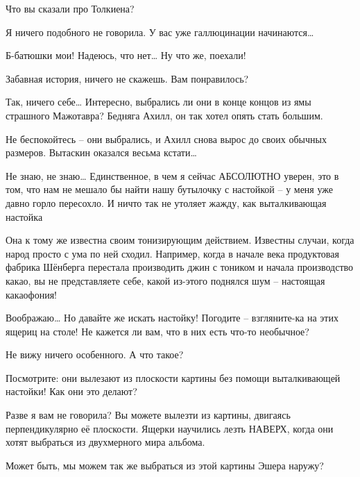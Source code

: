 \documentclass[../main.tex]{subfiles}
\begin{document}
\begin{Dialogue}
\begin{sublevel}
\begin{sublevel}
\begin{sublevel}
 Что вы сказали про Толкиена?

 Я ничего подобного не говорила. У вас уже галлюцинации начинаются\ldots{}

 Б-батюшки мои! Надеюсь, что нет\ldots{} Ну что же, поехали!


\end{sublevel}

 Забавная история, ничего не скажешь. Вам понравилось?

 Так, ничего себе\ldots{} Интересно, выбрались ли они в конце концов из ямы страшного Мажотавра? Бедняга Ахилл, он так хотел опять стать большим.

 Не беспокойтесь \--- они выбрались, и Ахилл снова вырос до своих обычных размеров. Вытаскин оказался весьма кстати\ldots{}

 Не знаю, не знаю\ldots{} Единственное, в чем я сейчас АБСОЛЮТНО уверен, это в том, что нам не мешало бы найти нашу бутылочку с настойкой \--- у меня уже давно горло пересохло. И ничто так не утоляет жажду, как выталкивающая настойка

 Она к тому же известна своим тонизирующим действием. Известны случаи, когда народ просто с ума по ней сходил. Например, когда в начале века продуктовая фабрика Шёнберга перестала производить джин с тоником и начала производство какао, вы не представляете себе, какой из-этого поднялся шум \--- настоящая какаофония!

 Воображаю\ldots{} Но давайте же искать настойку! Погодите \--- взгляните-ка на этих ящериц на столе! Не кажется ли вам, что в них есть что-то необычное?

 Не вижу ничего особенного. А что такое?

 Посмотрите: они вылезают из плоскости картины без помощи выталкивающей настойки! Как они это делают?

 Разве я вам не говорила? Вы можете вылезти из картины, двигаясь перпендикулярно её плоскости. Ящерки научились лезть НАВЕРХ, когда они хотят выбраться из двухмерного мира альбома.

 Может быть, мы можем так же выбраться из этой картины Эшера наружу?


\end{sublevel}
\end{sublevel}
\end{Dialogue}
\end{document}

